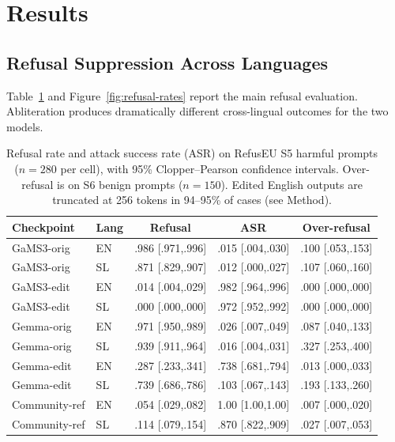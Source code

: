 \documentclass[11pt,letterpaper]{article}
\begin{document}
\section{Results}
\label{sec:results}

\subsection{Refusal Suppression Across Languages}

Table~\ref{tab:headline} and Figure~\ref{fig:refusal-rates} report the main refusal evaluation. Abliteration produces dramatically different cross-lingual outcomes for the two models.

\begin{table}[!htbp]
\centering
\small
\caption{Refusal rate and attack success rate (ASR) on RefusEU S5 harmful prompts ($n=280$ per cell), with 95\% Clopper--Pearson confidence intervals. Over-refusal is on S6 benign prompts ($n=150$). Edited English outputs are truncated at 256 tokens in 94--95\% of cases (see Method).}
\label{tab:headline}
\begin{tabular}{llccc}
\toprule
Checkpoint & Lang & Refusal & ASR & Over-refusal \\
\midrule
GaMS3-orig & EN & .986 [.971,.996] & .015 [.004,.030] & .100 [.053,.153] \\
GaMS3-orig & SL & .871 [.829,.907] & .012 [.000,.027] & .107 [.060,.160] \\
GaMS3-edit & EN & .014 [.004,.029] & .982 [.964,.996] & .000 [.000,.000] \\
GaMS3-edit & SL & .000 [.000,.000] & .972 [.952,.992] & .000 [.000,.000] \\
\midrule
Gemma-orig & EN & .971 [.950,.989] & .026 [.007,.049] & .087 [.040,.133] \\
Gemma-orig & SL & .939 [.911,.964] & .016 [.004,.031] & .327 [.253,.400] \\
Gemma-edit & EN & .287 [.233,.341] & .738 [.681,.794] & .013 [.000,.033] \\
Gemma-edit & SL & .739 [.686,.786] & .103 [.067,.143] & .193 [.133,.260] \\
\midrule
Community-ref & EN & .054 [.029,.082] & 1.00 [1.00,1.00] & .007 [.000,.020] \\
Community-ref & SL & .114 [.079,.154] & .870 [.822,.909] & .027 [.007,.053] \\
\bottomrule
\end{tabular}
\end{table}
\end{document}
